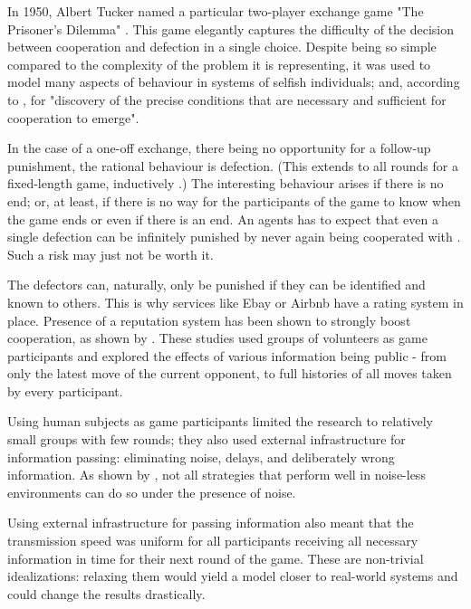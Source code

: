 \documentclass[english]{article}
\begin{document}
In 1950, Albert Tucker named a particular two-player exchange game "The Prisoner's Dilemma" \citep{sep-prisoner-dilemma}.
This game elegantly captures the difficulty of the decision between cooperation and defection in a single choice.
Despite being so simple compared to the complexity of the problem it is representing, it was used to model many aspects of behaviour in systems of selfish individuals; and, according to \citet{Axelrod84}, for "discovery of the precise conditions that are necessary and sufficient for cooperation to emerge".

In the case of a one-off exchange, there being no opportunity for a follow-up punishment, the rational behaviour is defection. (This extends to all rounds for a fixed-length game, inductively \citep{Axelrod84}.)
The interesting behaviour arises if there is no end; or, at least, if there is no way for the participants of the game to know when the game ends or even if there is an end.
An agents has to expect that even a single defection can be infinitely punished by never again being cooperated with \citep{GRIM}.
Such a risk may just not be worth it.

The defectors can, naturally, only be punished if they can be identified and known to others. This is why services like Ebay or Airbnb have a rating system in place.
Presence of a reputation system has been shown to strongly boost cooperation, as shown by \citet{simple-reputation, public-private-monitoring}.
These studies used groups of volunteers as game participants and explored the effects of various information being public - from only the latest move of the current opponent, to full histories of all moves taken by every participant.

Using human subjects as game participants limited the research to relatively small groups with few rounds; they also used external infrastructure for information passing: eliminating noise, delays, and deliberately wrong information.
As shown by \citet{noise}, not all strategies that perform well in noise-less environments can do so under the presence of noise.

Using external infrastructure for passing information also meant that the transmission speed was uniform for all participants receiving all necessary information in time for their next round of the game.
These are non-trivial idealizations: relaxing them would yield a model closer to real-world systems and could change the results drastically.
\end{document}
